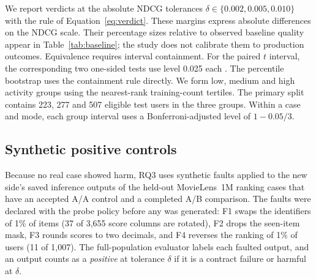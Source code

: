 \documentclass[11pt,a4paper]{article}
\begin{document}
We report verdicts at the absolute NDCG tolerances
$\delta\in\{0.002,0.005,0.010\}$ with the rule of Equation~\eqref{eq:verdict}.
These margins express absolute differences on the NDCG scale. Their
percentage sizes relative to observed baseline quality appear in
Table~\ref{tab:baseline}; the study does not calibrate them to production
outcomes. Equivalence requires interval containment. For the paired $t$
interval, the corresponding two one-sided tests use level 0.025 each
\citep{schuirmann1987tost}. The percentile bootstrap uses the containment
rule directly. We form low, medium and high activity groups using the nearest-rank
training-count tertiles. The primary split contains 223, 277 and 507 eligible
test users in the three groups. Within a case and mode, each group interval
uses a Bonferroni-adjusted level of $1-0.05/3$.

\subsection{Synthetic positive controls}
\label{sec:synthetic-design}
Because no real case showed harm, RQ3 uses synthetic faults applied to the
new side's saved inference outputs of the \synBase{} held-out MovieLens~1M
ranking cases that have an accepted A/A control and a completed A/B
comparison. The faults were declared with the probe policy before any was
generated: F1 swaps the identifiers of 1\% of items (37 of 3{,}655 score
columns are rotated), F2 drops the seen-item mask, F3 rounds scores to two
decimals, and F4 reverses the ranking of 1\% of users (11 of 1{,}007). The
full-population evaluator labels each faulted output, and an output counts as
a \emph{positive} at tolerance $\delta$ if it is a contract failure or harmful
at $\delta$.
\end{document}
